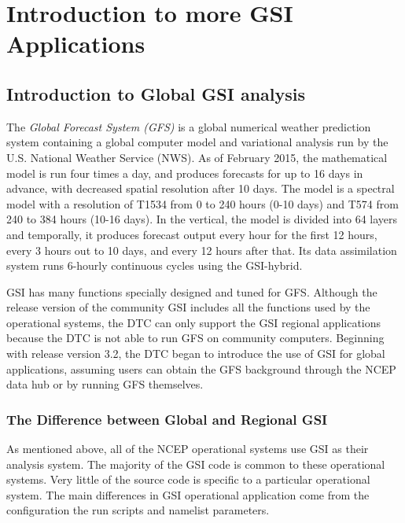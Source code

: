 \chapter{Introduction to more GSI Applications}
\setlength{\parskip}{12pt}

\section{Introduction to Global GSI analysis}

The \textit{Global Forecast System (GFS)} is a global numerical weather prediction system containing a global computer model and variational analysis 
run by the U.S. National Weather Service (NWS). As of February 2015, the mathematical model is run four times a day, and produces forecasts for up 
to 16 days in advance, with decreased spatial resolution after 10 days. The model is a spectral model with a resolution of T1534 from 0 to 240 hours 
(0-10 days) and T574 from 240 to 384 hours (10-16 days). In the vertical, the model is divided into 64 layers and temporally, it produces forecast output 
every hour for the first 12 hours, every 3 hours out to 10 days, and every 12 hours after that. Its data assimilation system runs 6-hourly continuous cycles 
using the GSI-hybrid.

GSI has many functions specially designed and tuned for GFS. Although the release version of the community GSI includes all the functions used by the 
operational systems, the DTC can only support the GSI regional applications because the DTC is not able to run GFS on community computers. Beginning 
with release version 3.2, the DTC began to introduce the use of GSI for global applications, assuming users can obtain the GFS background through the 
NCEP data hub or by running GFS themselves.

\subsection{The Difference between Global and Regional GSI}

As mentioned above, all of the NCEP operational systems use GSI as their analysis system. The majority of the GSI code is common to these 
operational systems. Very little of the source code is specific to a particular operational system. The main differences in GSI operational application 
come from the configuration the run scripts and namelist parameters.

